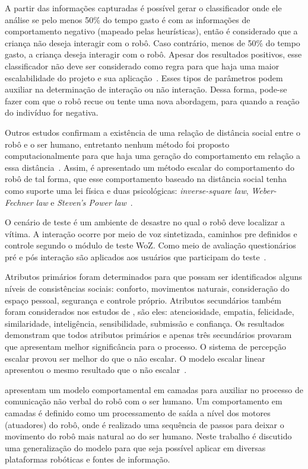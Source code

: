 A partir das informações capturadas é possível gerar o classificador onde ele análise se pelo menos 50\% do tempo gasto é com as informações de comportamento negativo (mapeado pelas heurísticas), então é considerado que a criança não deseja interagir com o robô. Caso contrário, menos de 50\% do tempo gasto, a criança deseja interagir com o robô. Apesar dos resultados positivos, esse classificador não deve ser considerado como regra para que haja uma maior escalabilidade do projeto e sua aplicação~\cite{feil-seifer:2010}. Esses tipos de parâmetros podem auxiliar na determinação de interação ou não interação. Dessa forma, pode-se fazer com que o robô recue ou tente uma nova abordagem, para quando a reação do indivíduo for negativa.

Outros estudos confirmam a existência de uma relação de distância social entre o robô e o ser humano, entretanto nenhum método foi proposto computacionalmente para que haja uma geração do comportamento em relação a essa distância~\cite{henkel:2012b}. Assim, é apresentado um método escalar do comportamento do robô de tal forma, que esse comportamento baseado na distância social tenha como suporte uma lei física e duas psicológicas: \emph{inverse-square law}, \emph{Weber-Fechner law} e \emph{Steven's Power law}~\cite{henkel:2012b}.

O cenário de teste é um ambiente de desastre no qual o robô deve localizar a vítima. A interação ocorre por meio de voz sintetizada, caminhos pre definidos e controle segundo o módulo de teste WoZ. Como meio de avaliação questionários pré e pós interação são aplicados aos usuários que participam do teste~\cite{henkel:2012b}.

Atributos primários foram determinados para que possam ser identificados alguns níveis de consistências sociais: conforto, movimentos naturais, consideração do espaço pessoal, segurança e controle próprio. Atributos secundários também foram considerados nos estudos de , são eles: atenciosidade, empatia, felicidade, similaridade, inteligência, sensibilidade, submissão e confiança. Os resultados demonstram que todos atributos primários e apenas três secundários provaram que apresentam melhor significância para o processo. O sistema de percepção escalar provou ser melhor do que o não escalar. O modelo escalar linear apresentou o mesmo resultado que o não escalar~\cite{henkel:2012b}.

 apresentam um modelo comportamental em camadas para auxiliar no processo de comunicação não verbal do robô com o ser humano. Um comportamento em camadas é definido como um processamento de saída a nível dos motores (atuadores) do robô, onde é realizado uma sequência de passos para deixar o movimento do robô mais natural ao do ser humano. Neste trabalho é discutido uma generalização do modelo para que seja possível aplicar em diversas plataformas robóticas e fontes de informação.

